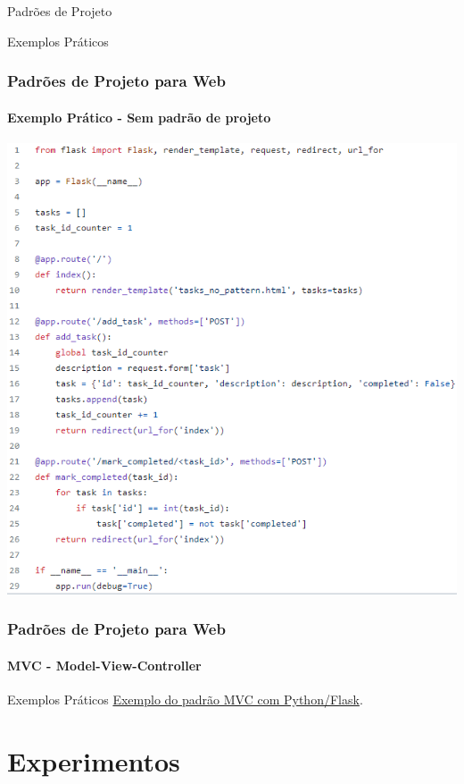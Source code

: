 \documentclass[
	9pt, %
	t, %
]{beamer}
\newcommand{\iconLink}[2]{\href{#1}{\faLink \hspace{0.2em} {#2}}}
\begin{document}

\begin{frame}
	\begin{center}

		\bigskip\bigskip\bigskip\bigskip %
		{\Large Padrões de Projeto}

		\bigskip\bigskip %
		{\Huge Exemplos Práticos}
	\end{center}

\end{frame}

\begin{frame}
	\frametitle{Padrões de Projeto para Web}
	\framesubtitle{Exemplo Prático - Sem padrão	de projeto}

	\includegraphics[width=0.6\linewidth]{Images/no_pattern.png}

\end{frame}

\begin{frame}
	\frametitle{Padrões de Projeto para Web}
	\framesubtitle{MVC - Model-View-Controller}

	\begin{block}{Exemplos Práticos}
		\iconLink{https://gist.github.com/fabricioifc/d1bde9f4a13cf63b49870be4bc87a72f}{Exemplo do padrão MVC com Python/Flask}.\\
	\end{block}
\end{frame}


\section{Experimentos}
\end{document}
